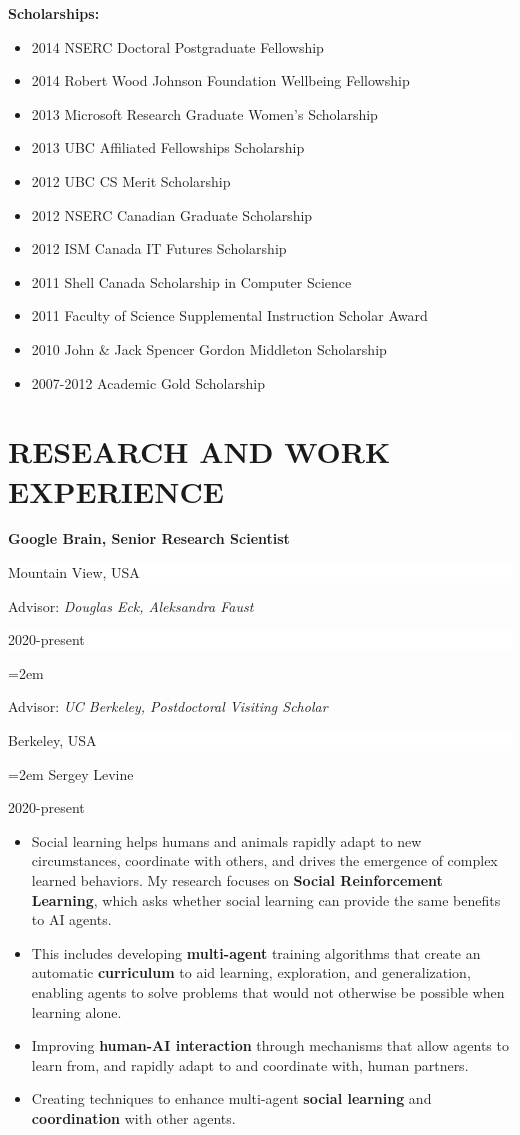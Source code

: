 \documentclass[paper=letter,fontsize=11pt]{scrartcl} %
\newcommand{\sepspace}{\vspace*{1em}}        %
\newcommand{\NewPart}[2]{\section*{\uppercase{#1} #2}}
\newcommand{\ResearchEntry}[5]{
        \noindent \textbf{#1} \hfill      %
        \colorbox{White}{%
            \parbox{10em}{%
            \hfill\color{Black}#2}} \par  %
        \noindent Advisor: \textit{#3} \hfill      %
        \colorbox{White}{%
            \parbox{6em}{%
            \hfill\color{Black}#4}} \par  %
        \noindent\hangindent=2em\hangafter=0 \small #5 %
        \normalsize \par}
\begin{document}
\noindent \textbf{Scholarships:}
\begin{itemize}
\item 2014 NSERC Doctoral Postgraduate Fellowship
\item 2014 Robert Wood Johnson Foundation Wellbeing Fellowship
\item 2013 Microsoft Research Graduate Women's Scholarship
\item 2013 UBC Affiliated Fellowships Scholarship
\item 2012 UBC CS Merit Scholarship
\item 2012 NSERC Canadian Graduate Scholarship
\item 2012 ISM Canada IT Futures Scholarship
\item 2011 Shell Canada Scholarship in Computer Science
\item 2011 Faculty of Science Supplemental Instruction Scholar Award
\item 2010 John \& Jack Spencer Gordon Middleton Scholarship
\item 2007-2012 Academic Gold Scholarship
\end{itemize}

\NewPart{Research and Work Experience}{}
\ResearchEntry{Google Brain, Senior Research Scientist}{Mountain View, USA}{Douglas Eck, Aleksandra Faust}{2020-present}%

\ResearchEntry{UC Berkeley, Postdoctoral Visiting Scholar}{Berkeley, USA}{Sergey Levine}{2020-present}%
{\begin{itemize}
    \item Social learning helps humans and animals rapidly adapt to new circumstances, coordinate with others, and drives the emergence of complex learned behaviors. My research focuses on \textbf{Social Reinforcement Learning}, which asks whether social learning can provide the same benefits to AI agents. 
    \item This includes developing \textbf{multi-agent} training algorithms that create an automatic \textbf{curriculum} to aid learning, exploration, and generalization, enabling agents to solve problems that would not otherwise be possible when learning alone.
    \item Improving \textbf{human-AI interaction} through mechanisms that allow agents to learn from, and rapidly adapt to and coordinate with, human partners. 
    \item Creating techniques to enhance multi-agent \textbf{social learning} and \textbf{coordination} with other agents.
\end{itemize}}
\sepspace
\end{document}
